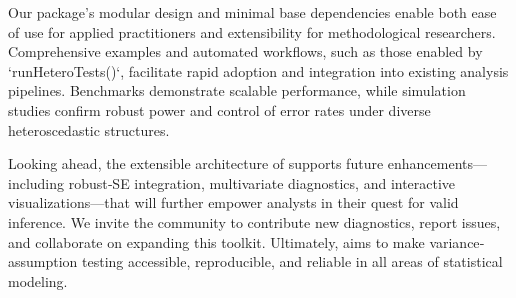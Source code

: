 Our package’s modular design and minimal base dependencies enable both ease of use for applied practitioners and extensibility for methodological researchers. Comprehensive examples and automated workflows, such as those enabled by `runHeteroTests()`, facilitate rapid adoption and integration into existing analysis pipelines. Benchmarks demonstrate scalable performance, while simulation studies confirm robust power and control of error rates under diverse heteroscedastic structures.

Looking ahead, the extensible architecture of  supports future enhancements—including robust‐SE integration, multivariate diagnostics, and interactive visualizations—that will further empower analysts in their quest for valid inference. We invite the community to contribute new diagnostics, report issues, and collaborate on expanding this toolkit. Ultimately,  aims to make variance‐assumption testing accessible, reproducible, and reliable in all areas of statistical modeling.





\address{Diogo Ribeiro\\
  Faculty of Media Arts and Design, Technical University of Porto\\
  Vila do Conde\\
  Portugal\\
  (ORCiD: 0009-0001-2022-7072)\\
  }

